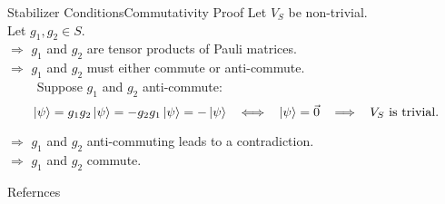 \documentclass[english,aspectratio=169]{tumbeamer}
\DeclareMathOperator{\means}{\quad\Longrightarrow\quad}
\DeclareMathOperator{\equivalent}{\quad\Longleftrightarrow\quad}
\begin{document}
    \begin{frame}{Stabilizer Conditions}{Commutativity Proof}
        \vspace*{-3mm}
        Let \(V_S\) be non-trivial. \\

        \vspace*{2mm}
        Let \(g_1,g_2\in S\). \\

        \vspace*{2mm}
        \(\Longrightarrow\)
        \(g_1\) and \(g_2\) are tensor products of Pauli matrices. \\

        \vspace*{2mm}
        \(\Longrightarrow\)
        \(g_1\) and \(g_2\) must either commute or anti-commute. \\

        \vspace*{2mm}
        \(\qquad\)
        Suppose \(g_1\) and \(g_2\) anti-commute:
        \[
            \ket{\psi}
            =g_1g_2\ket{\psi}
            =-g_2g_1\ket{\psi}
            =-\ket{\psi}
            \equivalent
            \ket{\psi}=\Vec{0}
            \means
            V_S\text{ is trivial.}
        \]

        \vspace*{2mm}
        \(\Longrightarrow\)
        \(g_1\) and \(g_2\) anti-commuting leads to a contradiction. \\

        \vspace*{2mm}
        \(\Longrightarrow\)
        \(g_1\) and \(g_2\) commute.

        \vspace*{5mm}
        {\footnotesize
        \cite*{01_QuantumComputationAndQuantumInformation}
        }
    \end{frame}



















    \begin{frame}{Refernces}
        \printbibliography
    \end{frame}
\end{document}
